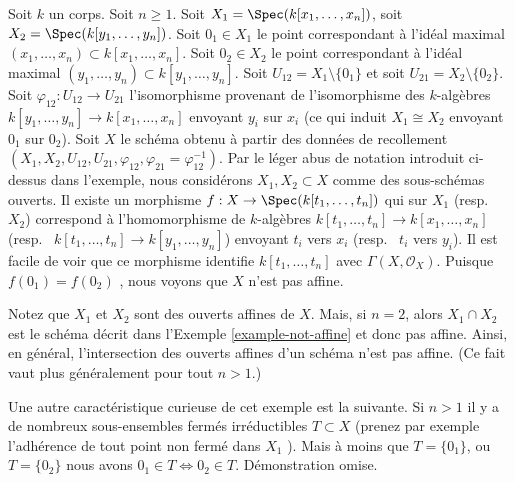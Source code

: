 \begin{example}
\label{example-affine-space-zero-doubled}
Soit  $k$  un corps. Soit  $n \geq 1$. Soit  $X_1 = \Spec(k[x_1, \ldots, x_n])$, soit
 $X_2 = \Spec(k[y_1, \ldots, y_n])$. Soit  $0_1 \in X_1$  le point correspondant à l'idéal maximal
 $(x_1, \ldots, x_n) \subset k[x_1, \ldots, x_n]$. Soit  $0_2 \in X_2$  le point correspondant à l'idéal maximal
 $(y_1, \ldots, y_n) \subset k[y_1, \ldots, y_n]$. Soit  $U_{12} = X_1 \setminus \{0_1\}$  et soit  $U_{21} = X_2 \setminus \{0_2\}$. Soit  $\varphi_{12} : U_{12} \to U_{21}$ 
l'isomorphisme provenant de l'isomorphisme des  $k$-algèbres  $k[y_1, \ldots, y_n] \to k[x_1, \ldots, x_n]$ 
envoyant  $y_i$  sur  $x_i$  (ce qui induit  $X_1 \cong X_2$  envoyant
 $0_1$  sur  $0_2$). Soit  $X$  le schéma obtenu à partir des
données de recollement  $(X_1, X_2, U_{12}, U_{21}, \varphi_{12},
\varphi_{21} = \varphi_{12}^{-1})$. Par le léger abus de notation introduit ci-dessus
dans l'exemple, nous considérons  $X_1, X_2 \subset X$  comme des sous-schémas ouverts. Il
existe un morphisme  $f : X \to \Spec(k[t_1, \ldots, t_n])$  qui sur  $X_1$  (resp.
\ $X_2$) correspond à l'homomorphisme de  $k$-algèbres
 $k[t_1, \ldots, t_n] \to k[x_1, \ldots, x_n]$  (resp. \ $k[t_1, \ldots, t_n] \to k[y_1, \ldots, y_n]$) envoyant  $t_i$  vers
 $x_i$  (resp. \   $t_i$  vers  $y_i$). Il est facile de
voir que ce morphisme identifie  $k[t_1, \ldots, t_n]$  avec  $\Gamma(X, \mathcal{O}_X)$. Puisque
 $f(0_1) = f(0_2)$ , nous voyons que  $X$  n'est pas affine.

\medskip\noindent
Notez que  $X_1$  et  $X_2$  sont des ouverts affines de  $X$.
Mais, si  $n = 2$, alors  $X_1 \cap X_2$  est le schéma décrit dans l'Exemple
 \ref{example-not-affine}  et donc pas affine. Ainsi, en général, l'intersection des ouverts
affines d'un schéma n'est pas affine. (Ce fait vaut plus généralement pour tout
 $n > 1$.)

\medskip\noindent
Une autre caractéristique curieuse de cet exemple est la suivante. Si  $n > 1$ 
il y a de nombreux sous-ensembles fermés irréductibles  $T \subset X$  (prenez par
exemple l'adhérence de tout point non fermé dans  $X_1$ ). Mais à
moins que  $T = \{0_1\}$, ou  $T = \{0_2\}$  nous avons  $0_1 \in T \Leftrightarrow 0_2 \in T$. Démonstration omise.
\end{example}

